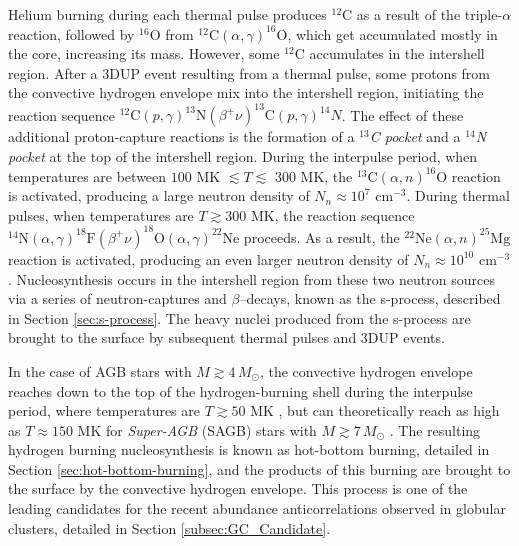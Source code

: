 Helium burning during each thermal pulse produces $^{12}$C as a result of the triple-$\alpha$ reaction, followed by $^{16}$O from $^{12}\mathrm{C}(\alpha,\gamma)^{16}\mathrm{O}$, which get accumulated mostly in the core, increasing its mass. However, some $^{12}$C accumulates in the intershell region. After a 3DUP event resulting from a thermal pulse, some protons from the convective hydrogen envelope mix into the intershell region, initiating the reaction sequence $^{12}\mathrm{C}(p,\gamma)^{13}\mathrm{N}(\beta^{+}\nu)^{13}\mathrm{C}(p,\gamma)^{14}N$. The effect of these additional proton-capture reactions is the formation of a \emph{$^{13}$C pocket} and a \emph{$^{14}$N pocket} at the top of the intershell region. During the interpulse period, when temperatures are between $100$ MK $\lesssim T \lesssim$ 300 MK, the $^{13}\mathrm{C}(\alpha,n)^{16}\mathrm{O}$ reaction is activated, producing a large neutron density of $N_{n} \approx 10^{7}$ $\mathrm{cm}^{-3}$. During thermal pulses, when temperatures are $T \gtrsim 300$ MK, the reaction sequence $^{14}\mathrm{N}(\alpha,\gamma)^{18}\mathrm{F}(\beta^{+}\nu)^{18}\mathrm{O}(\alpha,\gamma)^{22}\mathrm{Ne}$ proceeds. As a result, the $^{22}\mathrm{Ne}(\alpha,n)^{25}\mathrm{Mg}$ reaction is activated, producing an even larger neutron density of $N_{n} \approx 10^{10}$ $\mathrm{cm}^{-3}$. Nucleosynthesis occurs in the intershell region from these two neutron sources via a series of neutron-captures and $\beta$--decays, known as the s-process, described in Section \ref{sec:s-process}. The heavy nuclei produced from the s-process are brought to the surface by subsequent thermal pulses and 3DUP events.

In the case of AGB stars with $M \gtrsim 4 \, M_{\odot}$, the convective hydrogen envelope reaches down to the top of the hydrogen-burning shell during the interpulse period, where temperatures are $T \gtrsim 50$ MK \cite{Iliadis2015}, but can theoretically reach as high as $T \approx 150$ MK for \emph{Super-AGB} (SAGB) stars with $M \gtrsim 7 \, M_{\odot}$ \cite{Ventura2012}. The resulting hydrogen burning nucleosynthesis is known as hot-bottom burning, detailed in Section \ref{sec:hot-bottom-burning}, and the products of this burning are brought to the surface by the convective hydrogen envelope. This process is one of the leading candidates for the recent abundance anticorrelations observed in globular clusters, detailed in Section \ref{subsec:GC_Candidate}.

